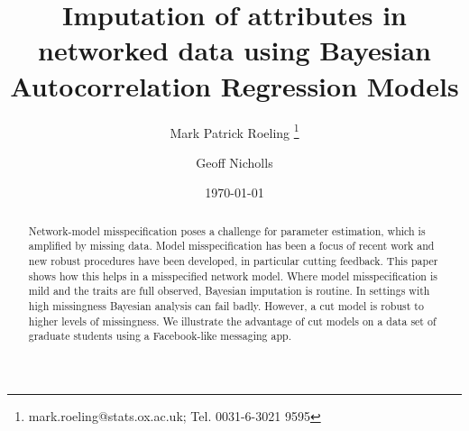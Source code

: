 \documentclass{article}
\begin{document}
\title{Imputation of attributes in networked data using Bayesian Autocorrelation Regression Models}
\author[12]{Mark Patrick Roeling \thanks{mark.roeling@stats.ox.ac.uk; Tel. 0031-6-3021 9595}}
\author[1]{Geoff Nicholls}
\date{\today}
\maketitle
	
\begin{abstract}
Network-model misspecification poses a challenge for parameter estimation, which is amplified by missing data. Model misspecification has been a focus of recent work and new robust procedures have been developed, in particular cutting feedback. This paper shows how this helps in a misspecified network model. Where model misspecification is mild and the traits are full observed, Bayesian imputation is routine. In settings with high missingness Bayesian analysis can fail badly. However, a cut model is robust to higher levels of missingness. We illustrate the advantage of cut models on a data set of graduate students using a Facebook-like messaging app.



\end{abstract}
\doublespacing
\newpage
\end{document}
